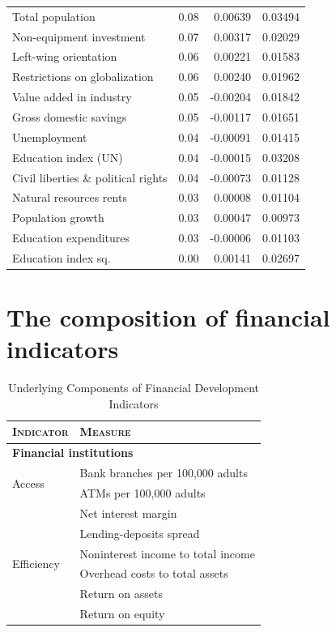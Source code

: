 \begin{refsection}
\begin{subappendices}
\begin{table}[ht!]
\begin{tabular}{lrrr}
  Total population & 0.08 & 0.00639 & 0.03494 \\ 
  Non-equipment investment & 0.07 & 0.00317 & 0.02029 \\ 
  Left-wing orientation & 0.06 & 0.00221 & 0.01583 \\ 
  Restrictions on globalization & 0.06 & 0.00240 & 0.01962 \\
  Value added in industry & 0.05 & -0.00204 & 0.01842 \\ 
  Gross domestic savings & 0.05 & -0.00117 & 0.01651 \\
  Unemployment & 0.04 & -0.00091 & 0.01415 \\ 
  Education index (UN) & 0.04 & -0.00015 & 0.03208 \\
  Civil liberties \& political rights & 0.04 & -0.00073 & 0.01128 \\ 
  Natural resources rents & 0.03 & 0.00008 & 0.01104 \\ 
  Population growth & 0.03 & 0.00047 & 0.00973 \\
  Education expenditures & 0.03 & -0.00006 & 0.01103 \\ 
  Education index sq. & 0.00 & 0.00141 & 0.02697 \\
       \bottomrule
   \end{tabular}
\end{table}
\clearpage

\section{The composition of financial indicators}
\label{ch4subsec:finind_comp}
\begin{table}[ht!]
    \small
    \caption{Underlying Components of Financial Development Indicators}
    \label{ch4tab:finind}
    \centering
    \begin{tabular}{ll}
      \toprule
      \textsc{Indicator} & \textsc{Measure} \\
      \midrule
      \multicolumn{2}{l}{\textbf{Financial institutions}} \\
      \midrule
      \multirow{2}{*}{Access} 	& Bank branches per 100,000 adults \\
                                  & ATMs per 100,000 adults \\
      \midrule
      \multirow{6}{*}{Efficiency}		& Net interest margin \\
                                  & Lending-deposits spread \\ 
                                  & Noninterest income to total income \\
                                  & Overhead costs to total assets \\
                                  & Return on assets \\
                                  & Return on equity \\
            

\end{tabular}
\end{table}
\end{subappendices}
\end{refsection}
